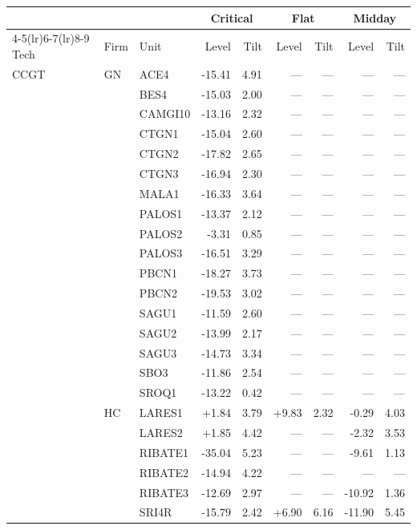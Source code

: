 \begin{tabular}{l l l r r r r r r}
\toprule
 & & & \multicolumn{2}{c}{Critical} & \multicolumn{2}{c}{Flat} & \multicolumn{2}{c}{Midday} \\
\cmidrule(lr){4-5}\cmidrule(lr){6-7}\cmidrule(lr){8-9}
Tech & Firm & Unit & Level & Tilt & Level & Tilt & Level & Tilt \\
\midrule
CCGT & GN & ACE4 & -15.41 & 4.91 & --- & --- & --- & --- \\
 &  & BES4 & -15.03 & 2.00 & --- & --- & --- & --- \\
 &  & CAMGI10 & -13.16 & 2.32 & --- & --- & --- & --- \\
 &  & CTGN1 & -15.04 & 2.60 & --- & --- & --- & --- \\
 &  & CTGN2 & -17.82 & 2.65 & --- & --- & --- & --- \\
 &  & CTGN3 & -16.94 & 2.30 & --- & --- & --- & --- \\
 &  & MALA1 & -16.33 & 3.64 & --- & --- & --- & --- \\
 &  & PALOS1 & -13.37 & 2.12 & --- & --- & --- & --- \\
 &  & PALOS2 & -3.31 & 0.85 & --- & --- & --- & --- \\
 &  & PALOS3 & -16.51 & 3.29 & --- & --- & --- & --- \\
 &  & PBCN1 & -18.27 & 3.73 & --- & --- & --- & --- \\
 &  & PBCN2 & -19.53 & 3.02 & --- & --- & --- & --- \\
 &  & SAGU1 & -11.59 & 2.60 & --- & --- & --- & --- \\
 &  & SAGU2 & -13.99 & 2.17 & --- & --- & --- & --- \\
 &  & SAGU3 & -14.73 & 3.34 & --- & --- & --- & --- \\
 &  & SBO3 & -11.86 & 2.54 & --- & --- & --- & --- \\
 &  & SROQ1 & -13.22 & 0.42 & --- & --- & --- & --- \\
 & HC & LARES1 & +1.84 & 3.79 & +9.83 & 2.32 & -0.29 & 4.03 \\
 &  & LARES2 & +1.85 & 4.42 & --- & --- & -2.32 & 3.53 \\
 &  & RIBATE1 & -35.04 & 5.23 & --- & --- & -9.61 & 1.13 \\
 &  & RIBATE2 & -14.94 & 4.22 & --- & --- & --- & --- \\
 &  & RIBATE3 & -12.69 & 2.97 & --- & --- & -10.92 & 1.36 \\
 &  & SRI4R & -15.79 & 2.42 & +6.90 & 6.16 & -11.90 & 5.45 \\

\end{tabular}
